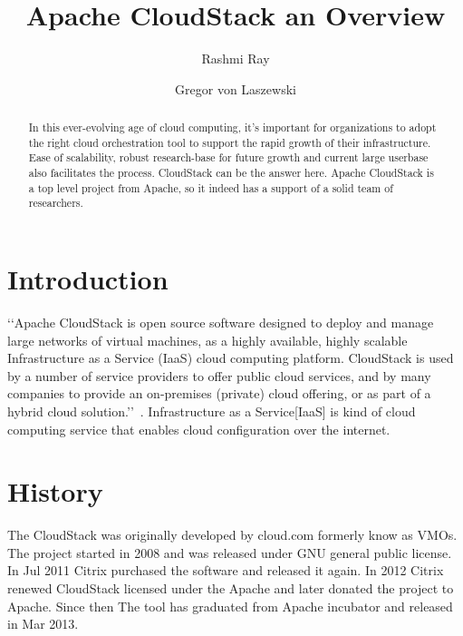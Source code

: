 
\title{Apache CloudStack an Overview}


\author{Rashmi Ray}

\author{Gregor von Laszewski}


\renewcommand{\shortauthors}{G. v. Laszewski}


\begin{abstract}
In this ever-evolving age of cloud computing, it’s important for organizations to adopt the right
cloud orchestration tool to support the rapid growth of their infrastructure. Ease of scalability, robust research-base
for future growth and current large userbase also facilitates the process. CloudStack can be the 
answer here. Apache CloudStack is a top level project from Apache, so it indeed has a support of a solid team of researchers.

\end{abstract}


\maketitle

\section{Introduction}
‘‘Apache CloudStack is open source software designed to deploy and manage large networks of 
virtual machines, as a highly available, highly scalable Infrastructure as a Service (IaaS)
cloud computing platform. CloudStack is used by a number of service providers to offer public 
cloud services, and by many companies to provide an on-premises (private) cloud offering, 
or as part of a hybrid cloud solution.’’~\cite{hid-sp18-417-www-cloudstack-intro}. 
Infrastructure as a Service[IaaS] is kind of cloud computing service that enables cloud 
configuration over the internet. 


\section{History}
The CloudStack was originally developed by cloud.com formerly know as VMOs. 
The project started in 2008 and was released under GNU general public license. 
In Jul 2011 Citrix purchased the software and released it again. In 2012 Citrix 
renewed CloudStack licensed under the Apache and later donated the project to Apache.
Since then The tool has graduated from Apache incubator and released in Mar 2013. 


